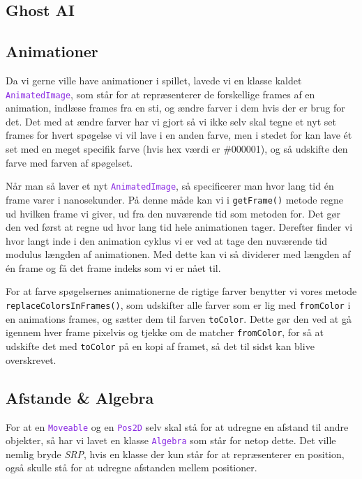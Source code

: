 \documentclass{article}
\newcommand{\code}[1]{\small\texttt{#1}}
\newcommand{\class}[1]{\textcolor{BlueViolet}{\small\texttt{#1}}}
\theoremstyle{mytheoremstyle}
\theoremstyle{mytheoremstyle}
\theoremstyle{myproblemstyle}
\begin{document}
\subsection{Ghost AI}\label{sub:Ghost AI} %


\subsection{Animationer}\label{sub:Animationer} %
Da vi gerne ville have animationer i spillet, lavede vi en klasse kaldet
\class{AnimatedImage}, som står for at repræsenterer de forskellige frames af en
animation, indlæse frames fra en sti, og ændre farver i dem hvis der er brug for
det. Det med at ændre farver har vi gjort så vi ikke selv skal tegne et nyt set
frames for hvert spøgelse vi vil lave i en anden farve, men i stedet for kan
lave ét set med en meget specifik farve (hvis hex værdi er \#000001), og så
udskifte den farve med farven af spøgelset.

Når man så laver et nyt \class{AnimatedImage}, så specificerer man hvor lang tid
én frame varer i nanosekunder. På denne måde kan vi i \code{getFrame()} metode
regne ud hvilken frame vi giver, ud fra den nuværende tid som metoden for. Det
gør den ved først at regne ud hvor lang tid hele animationen tager. Derefter
finder vi hvor langt inde i den animation cyklus vi er ved at tage den
nuværende tid modulus længden af animationen. Med dette kan vi så dividerer med
længden af én frame og få det frame indeks som vi er nået til.

For at farve spøgelsernes animationerne de rigtige farver benytter vi vores
metode \code{replaceColorsInFrames()}, som udskifter alle farver som er lig med
\code{fromColor} i en animations frames, og sætter dem til farven
\code{toColor}. Dette gør den ved at gå igennem hver frame pixelvis og tjekke om
de matcher \code{fromColor}, for så at udskifte det med \code{toColor} på en
kopi af framet, så det til sidst kan blive overskrevet.

\subsection{Afstande \& Algebra}
For at en \class{Moveable} og en \class{Pos2D} selv skal stå for at udregne en
afstand til andre objekter, så har vi lavet en klasse \class{Algebra} som står
for netop dette. Det ville nemlig bryde \textit{SRP}, hvis en klasse der kun
står for at repræsenterer en position, også skulle stå for at udregne afstanden
mellem positioner.
\end{document}
